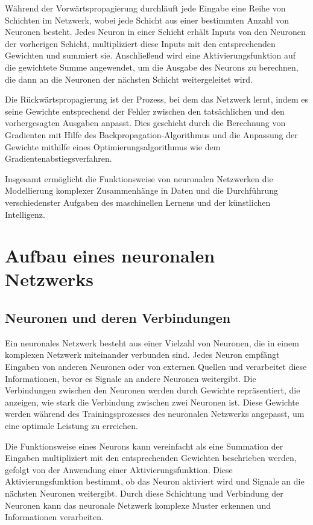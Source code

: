 Während der Vorwärtspropagierung durchläuft jede Eingabe eine Reihe von Schichten im Netzwerk, wobei jede Schicht aus einer bestimmten Anzahl von Neuronen besteht. Jedes Neuron in einer Schicht erhält Inputs von den Neuronen der vorherigen Schicht, multipliziert diese Inputs mit den entsprechenden Gewichten und summiert sie. Anschließend wird eine Aktivierungsfunktion auf die gewichtete Summe angewendet, um die Ausgabe des Neurons zu berechnen, die dann an die Neuronen der nächsten Schicht weitergeleitet wird.

Die Rückwärtspropagierung ist der Prozess, bei dem das Netzwerk lernt, indem es seine Gewichte entsprechend der Fehler zwischen den tatsächlichen und den vorhergesagten Ausgaben anpasst. Dies geschieht durch die Berechnung von Gradienten mit Hilfe des Backpropagation-Algorithmus und die Anpassung der Gewichte mithilfe eines Optimierungsalgorithmus wie dem Gradientenabstiegsverfahren.

Insgesamt ermöglicht die Funktionsweise von neuronalen Netzwerken die Modellierung komplexer Zusammenhänge in Daten und die Durchführung verschiedenster Aufgaben des maschinellen Lernens und der künstlichen Intelligenz.

\section{Aufbau eines neuronalen Netzwerks}
\label{sec:Grundlagen_Aufbau_neuronale_Netzwerke}
\subsection{Neuronen und deren Verbindungen}
\label{sec:Grundlagen_neuronen_und_Verbindungen}
Ein neuronales Netzwerk besteht aus einer Vielzahl von Neuronen, die in einem komplexen Netzwerk miteinander verbunden sind. Jedes Neuron empfängt Eingaben von anderen Neuronen oder von externen Quellen und verarbeitet diese Informationen, bevor es Signale an andere Neuronen weitergibt. Die Verbindungen zwischen den Neuronen werden durch Gewichte repräsentiert, die anzeigen, wie stark die Verbindung zwischen zwei Neuronen ist. Diese Gewichte werden während des Trainingsprozesses des neuronalen Netzwerks angepasst, um eine optimale Leistung zu erreichen.

Die Funktionsweise eines Neurons kann vereinfacht als eine Summation der Eingaben multipliziert mit den entsprechenden Gewichten beschrieben werden, gefolgt von der Anwendung einer Aktivierungsfunktion. Diese Aktivierungsfunktion bestimmt, ob das Neuron aktiviert wird und Signale an die nächsten Neuronen weitergibt. Durch diese Schichtung und Verbindung der Neuronen kann das neuronale Netzwerk komplexe Muster erkennen und Informationen verarbeiten.

